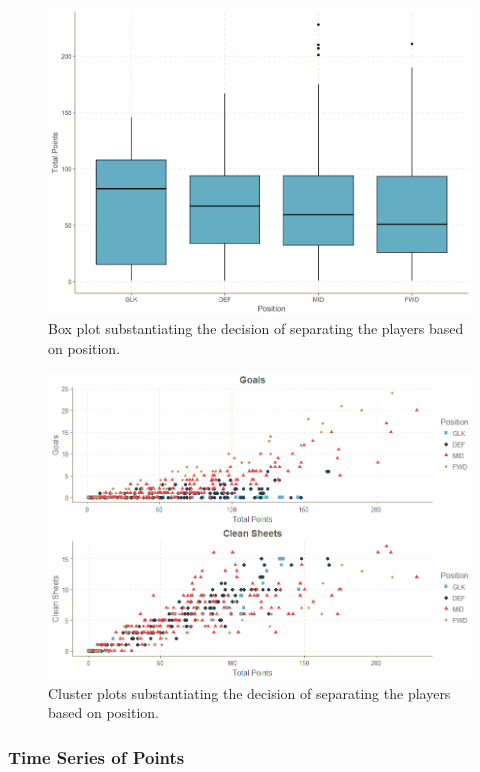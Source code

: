 \begin{figure}[H]
    \centering
    \includegraphics[scale=0.55]{fig/chapter_6/box_plots.png}
    \caption{Box plot substantiating the decision of separating the players based on position.}
\label{fig:box_plots}    
\end{figure}


\begin{figure}[H]
    \centering
    \includegraphics[scale=0.55]{fig/chapter_6/goals_cs.png}
    \caption{Cluster plots substantiating the decision of separating the players based on position.}
\label{fig:cluster_plots}    
\end{figure}


\subsubsection{Time Series of Points}

